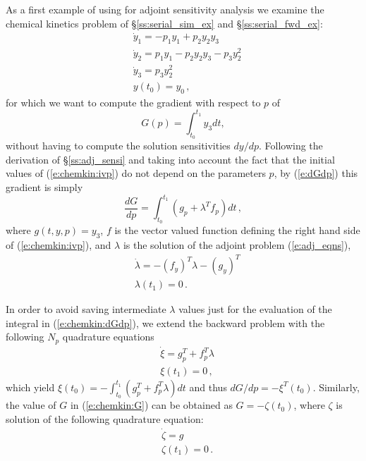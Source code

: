 As a first example of using {\cvodes} for adjoint sensitivity analysis
we examine the chemical kinetics problem of \S\ref{ss:serial_sim_ex} and
\S\ref{ss:serial_fwd_ex}:
\begin{equation}\label{e:chemkin:ivp}
  \begin{split}
    &{\dot y}_1 = -p_1 y_1 + p_2 y_2 y_3   \\
    &{\dot y}_2 =  p_1 y_1 - p_2 y_2 y_3 - p_3 y_2^2 \\
    &{\dot y}_3 =  p_3 y_2^2 \\
    &y(t_0) = y_0 \, ,
  \end{split}
\end{equation}
for which we want to compute the gradient with respect to $p$ of 
\begin{equation}\label{e:chemkin:G}
  G(p) = \int_{t_0}^{t_1}  y_3  dt ,
\end{equation}
without having to compute the solution sensitivities ${dy}/{dp}$.
Following the derivation of \S\ref{ss:adj_sensi} and taking into account
the fact that the initial values of (\ref{e:chemkin:ivp}) do not depend on 
the parameters $p$, by (\ref{e:dGdp}) this gradient is simply
\begin{equation}\label{e:chemkin:dGdp}
\frac{dG}{dp} = \int_{t_0}^{t_1} 
\left( g_p + \lambda^T f_p \right) dt \, ,
\end{equation}
where $g(t,y,p) = y_3$, $f$ is the vector valued function 
defining the right hand side of (\ref{e:chemkin:ivp}), and $\lambda$ is 
the solution of the adjoint problem (\ref{e:adj_eqns}),
\begin{equation}\label{e:chemkin:adj}
  \begin{split}
    &{\dot \lambda} = - (f_y)^T  \lambda - (g_y)^T \\
    &\lambda(t_1) = 0 \, .
  \end{split}
\end{equation}

In order to avoid saving intermediate $\lambda$ values just for the
evaluation of the integral in (\ref{e:chemkin:dGdp}), we extend the
backward problem with the following $N_p$ quadrature equations
\begin{equation}\label{e:chemkin:xi}
  \begin{split}
    &{\dot \xi} = g_p^T + f_p^T \lambda \\
    &\xi (t_1) = 0 \, ,
  \end{split}
\end{equation}
which yield $\xi(t_0) = - \int_{t_0}^{t_1} ( g_p^T + f_p^T \lambda) dt$
and thus ${dG}/{dp} = -\xi^T(t_0)$.
Similarly, the value of $G$ in (\ref{e:chemkin:G}) can be obtained as
$G = - \zeta(t_0)$, where $\zeta$ is solution of the following quadrature
equation:
\begin{equation}\label{e:chemkin:zeta}
  \begin{split}
    &{\dot\zeta} = g \\
    &\zeta(t_1) = 0 \, .
  \end{split}
\end{equation}

